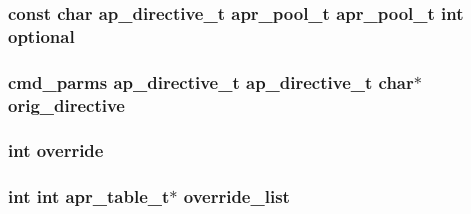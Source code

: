 \subsubsection[{\texorpdfstring{optional}{optional}}]{\setlength{\rightskip}{0pt plus 5cm}const char {\bf ap\+\_\+directive\+\_\+t} {\bf apr\+\_\+pool\+\_\+t} {\bf apr\+\_\+pool\+\_\+t} {\bf int} optional}\hypertarget{group__APACHE__CORE__CONFIG_ga0d991d5aa9b16b953fe82da8f1b09e9a}{}\label{group__APACHE__CORE__CONFIG_ga0d991d5aa9b16b953fe82da8f1b09e9a}
\subsubsection[{\texorpdfstring{orig\+\_\+directive}{orig_directive}}]{ {\bf cmd\+\_\+parms} {\bf ap\+\_\+directive\+\_\+t} {\bf ap\+\_\+directive\+\_\+t} char$\ast$ orig\+\_\+directive}\hypertarget{group__APACHE__CORE__CONFIG_gae4c34983fb2a6fbe364b62854dce0bba}{}\label{group__APACHE__CORE__CONFIG_gae4c34983fb2a6fbe364b62854dce0bba}
\subsubsection[{\texorpdfstring{override}{override}}]{ {\bf int} override}\hypertarget{group__APACHE__CORE__CONFIG_gada833e2a43b3b92346c3c4de408320e3}{}\label{group__APACHE__CORE__CONFIG_gada833e2a43b3b92346c3c4de408320e3}
\subsubsection[{\texorpdfstring{override\+\_\+list}{override_list}}]{ {\bf int} {\bf int} {\bf apr\+\_\+table\+\_\+t}$\ast$ override\+\_\+list}\hypertarget{group__APACHE__CORE__CONFIG_ga008f2f7405a84ce66b69e3f4e9ab0843}{}\label{group__APACHE__CORE__CONFIG_ga008f2f7405a84ce66b69e3f4e9ab0843}
